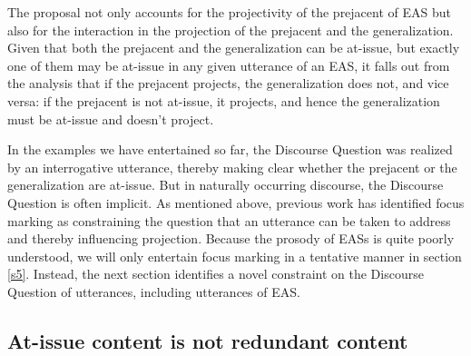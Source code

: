 \documentclass[11pt,fleqn]{article}
\newcommand{\6}{\mbox{$[\hspace*{-.6mm}[$}}
\newcommand{\9}{\mbox{$]\hspace*{-.6mm}]$}}
\begin{document}
The proposal not only accounts for the projectivity of the prejacent of EAS but also for the interaction in the projection of the prejacent and the generalization. Given that both the prejacent and the generalization can be at-issue, but exactly one of them may be at-issue in any given utterance of an EAS, it falls out from the analysis that if the prejacent projects, the generalization does not, and vice versa: if the prejacent is not at-issue, it projects, and hence the generalization must be at-issue and doesn't project.

In the examples we have entertained so far, the Discourse Question was realized by an interrogative utterance, thereby making clear whether the prejacent or the generalization are at-issue. But in naturally occurring discourse, the Discourse Question is often implicit. As mentioned above, previous work has identified focus marking as constraining the question that an utterance can be taken to address and thereby influencing projection. Because the prosody of EASs is quite poorly understood, we will only entertain focus marking in a tentative manner in section \ref{s5}. Instead, the next section identifies a novel constraint on the Discourse Question of utterances, including utterances of EAS.

\subsection{At-issue content is not redundant content}\label{s23}
\end{document}
